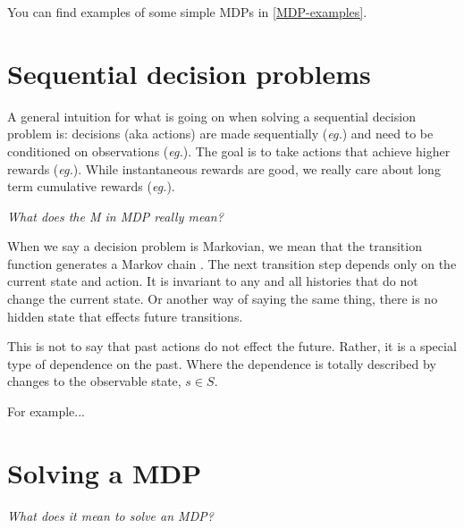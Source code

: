 
You can find examples of some simple MDPs in \ref{MDP-examples}.

\section{Sequential decision problems}

A general intuition for what is going on when solving a sequential decision problem is: decisions (aka actions) are made
sequentially (\textit{eg.}) and need to be conditioned on observations (\textit{eg.}).
The goal is to take actions that achieve higher rewards (\textit{eg.}). While instantaneous
rewards are good, we really care about long term cumulative rewards (\textit{eg.}).


\begin{displayquote}
  \textit{What does the M in MDP really mean?}
\end{displayquote}

When we say a decision problem is Markovian, we mean that the transition
function generates a Markov chain \cite{Markov2006}. The next transition step depends only
on the current state and action. It is invariant to any and all histories that do not
change the current state. Or another way of saying the same thing, there is no hidden state
that effects future transitions.

This is not to say that past actions do not effect the future. Rather,
it is a special type of dependence on the past. Where the dependence is
totally described by changes to the observable state, $s\in S$.

{\color{red}For example...}


\section{Solving a MDP}

\begin{displayquote}
  \textit{What does it mean to solve an MDP?}
\end{displayquote}

